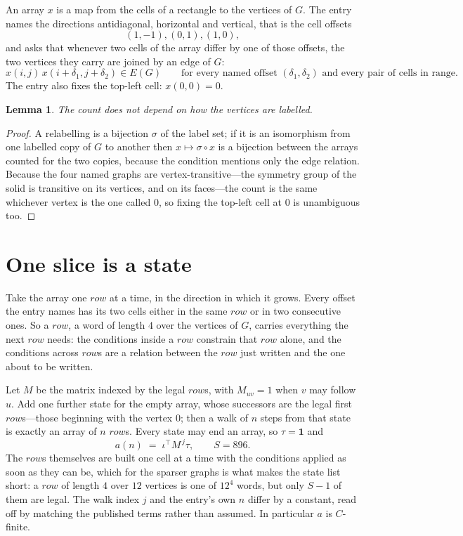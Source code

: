 \documentclass[11pt,a4paper]{article}
\theoremstyle{plain}
\newtheorem{lemma}[theorem]{Lemma}
\theoremstyle{definition}
\begin{document}
An array $x$ is a map from the cells of a rectangle to the vertices of $G$. The entry names the
directions antidiagonal, horizontal and vertical, that is the cell offsets
\[
(1,-1), (0,1), (1,0),
\]
and asks that whenever two cells of the array differ by one of those offsets, the two vertices
they carry are joined by an edge of $G$:
\[
x(i,j)\,x(i+\delta_1,j+\delta_2)\in E(G)\qquad
\text{for every named offset } (\delta_1,\delta_2)\text{ and every pair of cells in range.}
\]
The entry also fixes the top-left cell: $x(0,0)=0$.

\begin{lemma}\label{lem:label}
The count does not depend on how the vertices are labelled.
\end{lemma}

\begin{proof}
A relabelling is a bijection $\sigma$ of the label set; if it is an isomorphism from one
labelled copy of $G$ to another then $x\mapsto\sigma\circ x$ is a bijection between the arrays
counted for the two copies, because the condition mentions only the edge relation.
Because the four named graphs are vertex-transitive---the symmetry group of the solid is transitive on its vertices, and on its faces---the count is the same whichever vertex is the one called $0$, so fixing the top-left cell at $0$ is unambiguous too.
\end{proof}

\section{One slice is a state}

Take the array one $row$ at a time, in the direction in which it grows.
Every offset the entry names has its two cells either in the same $row$ or in two
consecutive ones. So a $row$, a word of length $4$ over the vertices of $G$, carries
everything the next $row$ needs: the conditions inside a $row$ constrain that
$row$ alone, and the conditions across $row$s are a relation between the
$row$ just written and the one about to be written.

Let $M$ be the matrix indexed by the legal $row$s, with $M_{uv}=1$ when $v$ may
follow $u$. Add one further state for the empty array, whose successors are the legal first
$row$s---those beginning with the vertex $0$; then a walk of
$n$ steps from that state is exactly an array of $n$ $row$s. Every state may end an
array, so $\tau=\mathbf{1}$ and
\[
a(n)\;=\;\iota^{\!\top}M^{\,j}\tau ,\qquad S=896.
\]
The $row$s themselves are built one cell at a time with the conditions applied as soon
as they can be, which for the sparser graphs is what makes the state list short: a $row$
of length $4$ over $12$ vertices is one of $12^{4}$ words, but only $S-1$ of them are
legal. The walk index $j$ and the entry's own $n$ differ by a constant, read off by matching the
published terms rather than assumed. In particular $a$ is $C$-finite.
\end{document}
